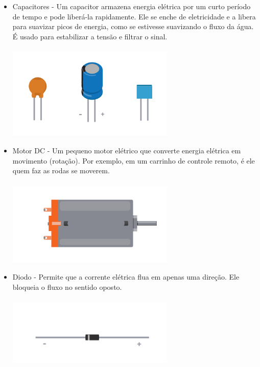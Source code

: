 \documentclass{report}
\begin{document}
\begin{itemize}
		\item Capacitores - Um capacitor armazena energia elétrica por um curto período de tempo e pode liberá-la rapidamente. Ele se enche de eletricidade e a libera para suavizar picos de energia, como se estivesse suavizando o fluxo da água. É usado para estabilizar a tensão e filtrar o sinal. \\ \\
		\includegraphics[width=8cm]{imagens/capacitores.png}
		
		\item Motor DC - Um pequeno motor elétrico que converte energia elétrica em movimento (rotação). Por exemplo, em um carrinho de controle remoto, é ele quem faz as rodas se moverem. \\ \\
		\includegraphics[width=8cm]{imagens/motor_dc.png}
		
		\item Diodo - Permite que a corrente elétrica flua em apenas uma direção. Ele bloqueia o fluxo no sentido oposto.\\ \\
		\includegraphics[width=8cm]{imagens/diodo.png}
		

\end{itemize}
\end{document}
